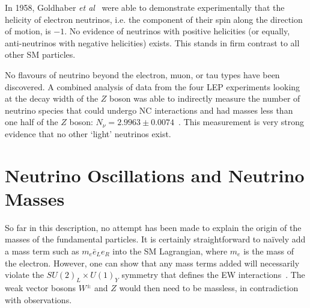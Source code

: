 In 1958, Goldhaber \textit{et al}~\cite{goldhaberHelicityNeutrinos1958} were able to demonstrate experimentally that the helicity of electron neutrinos, i.e. the component of their spin along the direction of motion, is $-1$. No evidence of neutrinos with positive helicities (or equally, anti-neutrinos with negative helicities) exists. This stands in firm contrast to all other SM particles.

No flavours of neutrino beyond the electron, muon, or tau types have been discovered. A combined analysis of data from the four LEP experiments looking at the decay width of the $Z$ boson was able to indirectly measure the number of neutrino species that could undergo NC interactions and had masses less than one half of the $Z$ boson: $N_{\nu} = 2.9963\pm0.0074$~\cite{PrecisionElectroweakMeasurements2006,janotImprovedBhabhaCross2020}. %
This measurement is very strong evidence that no other `light' neutrinos exist.



\section{Neutrino Oscillations and Neutrino Masses}
So far in this description, no attempt has been made to explain the origin of the masses of the fundamental particles. It is certainly straightforward to na\"{i}vely add a mass term such as $m_{e}\bar{e}_{L}e_{R}$ into the SM Lagrangian, where $m_e$ is the mass of the electron. However, one can show that any mass terms added will necessarily violate the $SU(2)_{L}\times U(1)_{Y}$ symmetry that defines the EW interactions~\cite{deppischChapterNeutrinosStandard2019}. %
The weak vector bosons $W^{\pm}$ and $Z$ would then need to be massless, in contradiction with observations.

